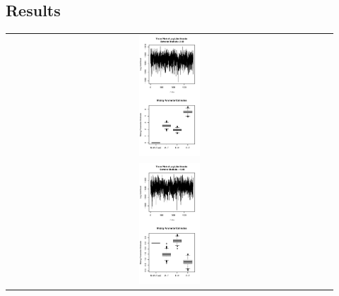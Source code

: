 \documentclass{pnastwo}
\begin{document}
\begin{article}
\section{Results} 


\begin{tabular}{c}
\includegraphics[width = 0.19\textwidth]{images/SS_Columbus_11-30-14_Beta1.pdf}\\
\includegraphics[width = 0.19\textwidth]{images/SS_Columbus_11-30-14_Beta10.pdf}
\end{tabular}




\end{article}
\end{document}

